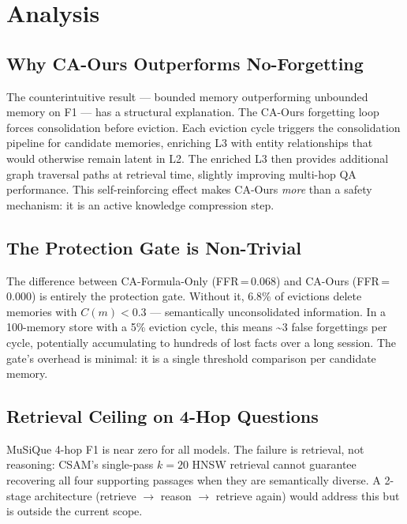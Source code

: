 \documentclass{article}
\begin{document}
\section{Analysis}
\label{sec:analysis}

\subsection{Why CA-Ours Outperforms No-Forgetting}

The counterintuitive result — bounded memory outperforming unbounded memory
on F1 — has a structural explanation.  The CA-Ours forgetting loop forces
consolidation before eviction.  Each eviction cycle triggers the consolidation
pipeline for candidate memories, enriching L3 with entity relationships that
would otherwise remain latent in L2.  The enriched L3 then provides additional
graph traversal paths at retrieval time, slightly improving multi-hop QA
performance.  This self-reinforcing effect makes CA-Ours \emph{more} than a
safety mechanism: it is an active knowledge compression step.

\subsection{The Protection Gate is Non-Trivial}

The difference between CA-Formula-Only (FFR\,=\,0.068) and CA-Ours
(FFR\,=\,0.000) is entirely the protection gate.  Without it, 6.8\% of
evictions delete memories with $C(m) < 0.3$ — semantically unconsolidated
information.  In a 100-memory store with a 5\% eviction cycle, this means
\textasciitilde{}3 false forgettings per cycle, potentially accumulating to
hundreds of lost facts over a long session.  The gate's overhead is minimal:
it is a single threshold comparison per candidate memory.

\subsection{Retrieval Ceiling on 4-Hop Questions}

MuSiQue 4-hop F1 is near zero for all models.  The failure is retrieval,
not reasoning: CSAM's single-pass $k=20$ HNSW retrieval cannot guarantee
recovering all four supporting passages when they are semantically diverse.
A 2-stage architecture (retrieve $\rightarrow$ reason $\rightarrow$ retrieve
again) would address this but is outside the current scope.
\end{document}
